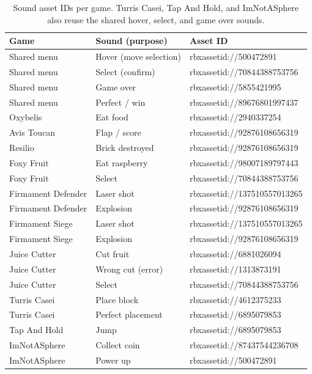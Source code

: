 \documentclass[12pt,letterpaper]{article}
\begin{document}
\begin{table}[H]
\centering
\footnotesize
\begin{tabular}{|p{3cm}|p{6cm}|p{6cm}|}
\hline
\textbf{Game} & \textbf{Sound (purpose)} & \textbf{Asset ID} \\
\hline
Shared menu & Hover (move selection) & rbxassetid://500472891 \\
\hline
Shared menu & Select (confirm) & rbxassetid://70844388753756 \\
\hline
Shared menu & Game over & rbxassetid://5855421995 \\
\hline
Shared menu & Perfect / win & rbxassetid://89676801997437 \\
\hline
Oxybelis & Eat food & rbxassetid://2940337254 \\
\hline
Avis Toucan & Flap / score & rbxassetid://92876108656319 \\
\hline
Resilio & Brick destroyed & rbxassetid://92876108656319 \\
\hline
Foxy Fruit & Eat raspberry & rbxassetid://98007189797443 \\
\hline
Foxy Fruit & Select & rbxassetid://70844388753756 \\
\hline
Firmament Defender & Laser shot & rbxassetid://137510557013265 \\
\hline
Firmament Defender & Explosion & rbxassetid://92876108656319 \\
\hline
Firmament Siege & Laser shot & rbxassetid://137510557013265 \\
\hline
Firmament Siege & Explosion & rbxassetid://92876108656319 \\
\hline
Juice Cutter & Cut fruit & rbxassetid://6881026094 \\
\hline
Juice Cutter & Wrong cut (error) & rbxassetid://1313873191 \\
\hline
Juice Cutter & Select & rbxassetid://70844388753756 \\
\hline
Turris Casei & Place block & rbxassetid://4612375233 \\
\hline
Turris Casei & Perfect placement & rbxassetid://6895079853 \\
\hline
Tap And Hold & Jump & rbxassetid://6895079853 \\
\hline
ImNotASphere & Collect coin & rbxassetid://87437544236708 \\
\hline
ImNotASphere & Power up & rbxassetid://500472891 \\
\hline
\end{tabular}
\caption{Sound asset IDs per game. Turris Casei, Tap And Hold, and ImNotASphere also reuse the shared hover, select, and game over sounds.}
\end{table}
\end{document}
